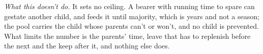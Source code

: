 \emph{What this doesn't do.} It sets no ceiling. A bearer with running time to spare can gestate another child, and feeds it until majority, which is years and not a season; the pool carries the child whose parents can't or won't, and no child is prevented. What limits the number is the parents' time, leave that has to replenish before the next and the keep after it, and nothing else does.
